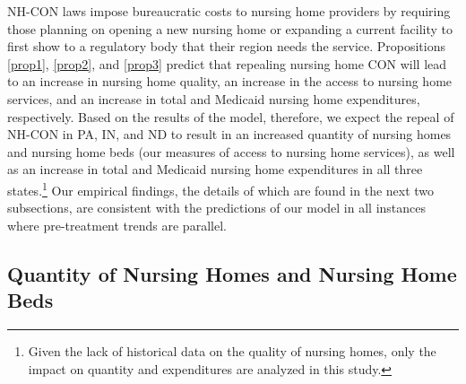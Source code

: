 \documentclass[../Main.tex]{subfiles}
\begin{document}
NH-CON laws impose bureaucratic costs to nursing home providers by requiring those planning on opening a new nursing home or expanding a current facility to first show to a regulatory body that their region needs the service.  Propositions \ref{prop1}, \ref{prop2}, and \ref{prop3} predict that repealing nursing home CON will lead to an increase in nursing home quality, an increase in the access to nursing home services, and an increase in total and Medicaid nursing home expenditures, respectively. Based on the results of the model, therefore, we expect the repeal of NH-CON in PA, IN, and ND to result in an increased quantity of nursing homes and nursing home beds (our measures of access to nursing home services), as well as an increase in total and Medicaid nursing home expenditures in all three states.\footnote{Given the lack of historical data on the quality of nursing homes, only the impact on quantity and expenditures are analyzed in this study.}  Our empirical findings, the details of which are found in the next two subsections, are consistent with the predictions of our model in all instances where pre-treatment trends are parallel.

\subsection{Quantity of Nursing Homes and Nursing Home Beds}
\end{document}
